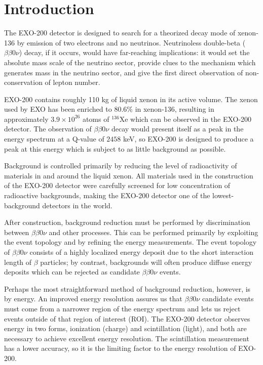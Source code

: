 \renewcommand{\thechapter}{1}
\chapter{Introduction}
\label{ch:Introduction}

The EXO-200 detector is designed to search for a theorized decay mode of xenon-136 by emission of two electrons and no neutrinos.  Neutrinoless double-beta ($\beta\beta 0\nu$) decay, if it occurs, would have far-reaching implications: it would set the absolute mass scale of the neutrino sector, provide clues to the mechanism which generates mass in the neutrino sector, and give the first direct observation of non-conservation of lepton number.

EXO-200 contains roughly 110 kg of liquid xenon in its active volume.  The xenon used by EXO has been enriched to $80.6\%$ in xenon-136, resulting in approximately $3.9 \times 10^{26}$ atoms of $^{136}$Xe which can be observed in the EXO-200 detector.  The observation of $\beta\beta 0\nu$ decay would present itself as a peak in the energy spectrum at a Q-value of $2458$ keV, so EXO-200 is designed to produce a peak at this energy which is subject to as little background as possible.

Background is controlled primarily by reducing the level of radioactivity of materials in and around the liquid xenon.  All materials used in the construction of the EXO-200 detector were carefully screened for low concentration of radioactive backgrounds, making the EXO-200 detector one of the lowest-background detectors in the world.

After construction, background reduction must be performed by discrimination between $\beta\beta 0\nu$ and other processes.  This can be performed primarily by exploiting the event topology and by refining the energy measurements.  The event topology of $\beta\beta 0\nu$ consists of a highly localized energy deposit due to the short interaction length of $\beta$ particles; by contrast, backgrounds will often produce diffuse energy deposits which can be rejected as candidate $\beta\beta 0\nu$ events.

Perhaps the most straightforward method of background reduction, however, is by energy.  An improved energy resolution assures us that $\beta\beta 0\nu$ candidate events must come from a narrower region of the energy spectrum and lets us reject events outside of that region of interest (ROI).  The EXO-200 detector observes energy in two forms, ionization (charge) and scintillation (light), and both are necessary to achieve excellent energy resolution.  The scintillation measurement has a lower accuracy, so it is the limiting factor to the energy resolution of EXO-200.


